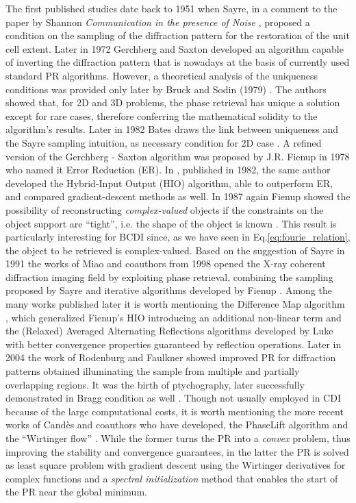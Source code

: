 The first published studies date back to 1951 when Sayre, in a comment \cite{Sayre_1952} to the paper by 
Shannon \textit{Communication in the presence of Noise} \cite{Shannon_1949}, proposed a condition on the sampling of the diffraction 
pattern for the restoration of the unit cell extent. Later in 1972 Gerchberg and Saxton \cite{gerchberg1972} developed an 
algorithm capable of inverting the diffraction pattern that is nowadays at the basis of currently used standard PR algorithms. 
However, a theoretical analysis of the uniqueness conditions was provided only later by Bruck and Sodin (1979) \cite{BruckSodin1979}. 
The authors showed that, for 2D and 3D problems, the phase retrieval has unique a solution except for rare cases, therefore conferring the mathematical solidity to the algorithm's results. Later in 1982 Bates draws the link between uniqueness and 
the Sayre sampling intuition, as necessary condition for 2D case \cite{Bates1982}. A refined version of the Gerchberg - Saxton algorithm 
was proposed by J.R. Fienup in 1978 \cite{fienup_reconstruction_1978}
who named it Error Reduction (ER). In \cite{fienup_phase_1982}, published in 1982, the same author developed the Hybrid-Input Output (HIO) algorithm, 
able to outperform ER, and compared gradient-descent methods as well. In 1987 again Fienup showed the possibility of reconstructing 
\textit{complex-valued} objects if the constraints on the object support are ``tight'', i.e. the shape of the object 
is known \cite{Fienup1987}. This result is particularly interesting for BCDI since, as we have seen in Eq.\ref{eq:fourie_relation}, 
the object to be retrieved is complex-valued. 
Based on the suggestion of Sayre in 1991 \cite{sayre1991direct} the works of Miao and coauthors from 1998 
opened the X-ray coherent diffraction imaging field by exploiting phase retrieval, combining the sampling proposed by Sayre and
iterative algorithms developed by Fienup \cite{Miao1998, Miao1999, Miao2000}. Among the many works published later it is worth 
mentioning the Difference Map algorithm \cite{Elser2003}, which generalized Fienup's HIO introducing an additional 
non-linear term and the (Relaxed) Averaged Alternating Reflections algorithms developed by Luke \cite{AAR_2004, Luke_2004} 
with better convergence properties guaranteed by reflection operations. Later in 2004 the work of Rodenburg and Faulkner 
\cite{RodenburgFaulkner2004} showed improved
PR for diffraction patterns obtained illuminating the sample from multiple and partially overlapping regions. 
It was the birth of ptychography, later successfully demonstrated in Bragg condition as well \cite{Godard2011}. Though 
not usually employed in CDI because of the 
large computational costs, it is worth mentioning the more recent works of Cand{\`e}s and coauthors who have developed, 
the PhaseLift algorithm \cite{CandesStrohmerVoroninski2013} and the ``Wirtinger flow'' \cite{Wirtinger1927}. While the 
former turns the PR into a \textit{convex} problem, thus improving the stability and convergence guarantees, in the latter 
the PR is solved as least square problem with gradient descent using the Wirtinger derivatives for complex functions 
and a \textit{spectral initialization} method that enables the start of the PR near the global minimum.

